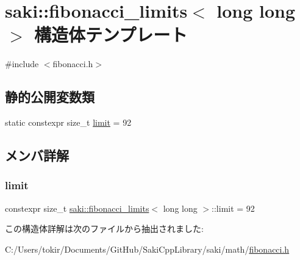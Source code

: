 \hypertarget{structsaki_1_1fibonacci__limits_3_01long_01long_01_4}{}\section{saki\+:\+:fibonacci\+\_\+limits$<$ long long $>$ 構造体テンプレート}
\label{structsaki_1_1fibonacci__limits_3_01long_01long_01_4}


{\ttfamily \#include $<$fibonacci.\+h$>$}

\subsection*{静的公開変数類}
\begin{DoxyCompactItemize}
\item 
static constexpr size\+\_\+t \mbox{\hyperlink{structsaki_1_1fibonacci__limits_3_01long_01long_01_4_a8366d04823d048deed92a1b83cd689fd}{limit}} = 92
\end{DoxyCompactItemize}


\subsection{メンバ詳解}
\mbox{\label{structsaki_1_1fibonacci__limits_3_01long_01long_01_4_a8366d04823d048deed92a1b83cd689fd}} 
\subsubsection{\texorpdfstring{limit}{limit}}
{\footnotesize\ttfamily constexpr size\+\_\+t \mbox{\hyperlink{structsaki_1_1fibonacci__limits}{saki\+::fibonacci\+\_\+limits}}$<$ long long $>$\+::limit = 92\hspace{0.3cm}{\ttfamily [static]}}



この構造体詳解は次のファイルから抽出されました\+:\begin{DoxyCompactItemize}
\item 
C\+:/\+Users/tokir/\+Documents/\+Git\+Hub/\+Saki\+Cpp\+Library/saki/math/\mbox{\hyperlink{fibonacci_8h}{fibonacci.\+h}}\end{DoxyCompactItemize}
